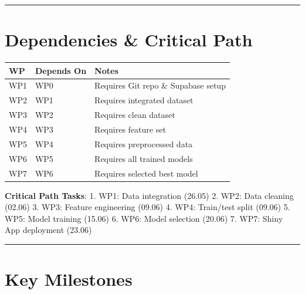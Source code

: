 \documentclass[
  english,
  letterpaper,
  DIV=11,
  numbers=noendperiod]{scrreprt}
\newcounter{none} %
\begin{document}
\begin{center}\rule{0.5\linewidth}{0.5pt}\end{center}

\section{Dependencies \& Critical
Path}\label{dependencies-critical-path}

{\def\LTcaptype{none} %
\begin{longtable}[]{@{}lll@{}}
\toprule\noalign{}
WP & Depends On & Notes \\
\midrule\noalign{}
\endhead
\bottomrule\noalign{}
\endlastfoot
WP1 & WP0 & Requires Git repo \& Supabase setup \\
WP2 & WP1 & Requires integrated dataset \\
WP3 & WP2 & Requires clean dataset \\
WP4 & WP3 & Requires feature set \\
WP5 & WP4 & Requires preprocessed data \\
WP6 & WP5 & Requires all trained models \\
WP7 & WP6 & Requires selected best model \\
\end{longtable}
}

\textbf{Critical Path Tasks}: 1. WP1: Data integration (26.05) 2. WP2:
Data cleaning (02.06) 3. WP3: Feature engineering (09.06) 4. WP4:
Train/test split (09.06) 5. WP5: Model training (15.06) 6. WP6: Model
selection (20.06) 7. WP7: Shiny App deployment (23.06)

\begin{center}\rule{0.5\linewidth}{0.5pt}\end{center}

\section{Key Milestones}\label{key-milestones}
\end{document}
